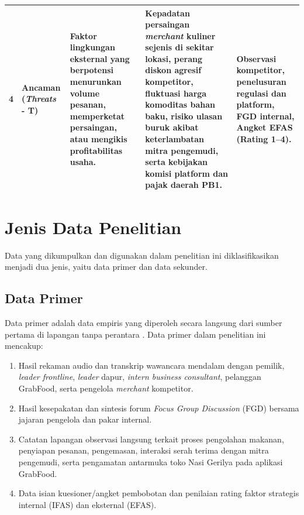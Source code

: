 \begin{xltabular}{\textwidth}{|C{0.6cm}|Z{2.4cm}|Y|Y|L{2.8cm}|}
        4 & Ancaman (\textit{Threats} - T) & Faktor lingkungan eksternal yang berpotensi menurunkan volume pesanan, memperketat persaingan, atau mengikis profitabilitas usaha. & Kepadatan persaingan \textit{merchant} kuliner sejenis di sekitar lokasi, perang diskon agresif kompetitor, fluktuasi harga komoditas bahan baku, risiko ulasan buruk akibat keterlambatan mitra pengemudi, serta kebijakan komisi platform dan pajak daerah PB1. & Observasi kompetitor, penelusuran regulasi dan platform, FGD internal, Angket EFAS (Rating 1--4). \\ \hline
    \end{xltabular}
\endgroup

\section{Jenis Data Penelitian}
Data yang dikumpulkan dan digunakan dalam penelitian ini diklasifikasikan menjadi dua jenis, yaitu data primer dan data sekunder.

\subsection{Data Primer}
Data primer adalah data empiris yang diperoleh secara langsung dari sumber pertama di lapangan tanpa perantara \parencite{patton2015qualitativeevaluation}. Data primer dalam penelitian ini mencakup:
\begin{enumerate}
    \item Hasil rekaman audio dan transkrip wawancara mendalam dengan pemilik, \textit{leader frontline}, \textit{leader} dapur, \textit{intern business consultant}, pelanggan GrabFood, serta pengelola \textit{merchant} kompetitor.
    \item Hasil kesepakatan dan sintesis forum \textit{Focus Group Discussion} (FGD) bersama jajaran pengelola dan pakar internal.
    \item Catatan lapangan observasi langsung terkait proses pengolahan makanan, penyiapan pesanan, pengemasan, interaksi serah terima dengan mitra pengemudi, serta pengamatan antarmuka toko Nasi Gerilya pada aplikasi GrabFood.
    \item Data isian kuesioner/angket pembobotan dan penilaian rating faktor strategis internal (IFAS) dan eksternal (EFAS).
\end{enumerate}

